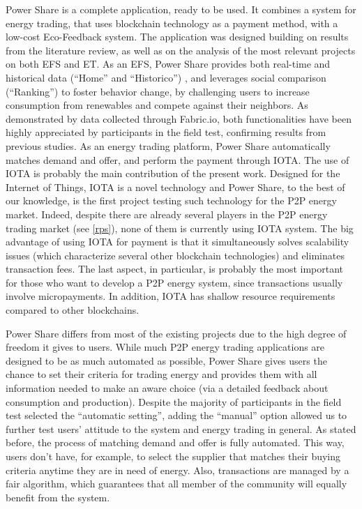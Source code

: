 \cleardoublepage
\label{chap:conclusions}

	
Power Share is a complete application, ready to be used. It combines a system for energy trading, that uses blockchain technology as a payment method, with a low-cost Eco-Feedback system. The application was designed building on results from the literature review, as well as on the analysis of the most relevant projects on both \ac{EFS} and \ac{ET}.
As an \ac{EFS}, Power Share provides both real-time and historical data (“Home” and “Historico”) \cite{Giulio2009}, and leverages social comparison (“Ranking”) \cite{Froehlich2010} to foster behavior change, by challenging users to increase consumption from renewables and compete against their neighbors. As demonstrated by data collected through Fabric.io, both functionalities have been highly appreciated by participants in the field test, confirming results from previous studies.
As an energy trading platform, Power Share automatically matches demand and offer, and perform the payment through IOTA. The use of IOTA is probably the main contribution of the present work. Designed for the Internet of Things, IOTA is a novel technology and Power Share, to the best of our knowledge, is the first project testing such technology for the \ac{P2P} energy market. Indeed, despite there are already several players in the \ac{P2P} energy trading market (see \cref{rps}), none of them is currently using IOTA system. The big advantage of using IOTA for payment is that it simultaneously solves scalability issues (which characterize several other blockchain technologies) and eliminates transaction fees. The last aspect, in particular, is probably the most important for those who want to develop a \ac{P2P} energy system, since transactions usually involve micropayments. In addition, IOTA has shallow resource requirements compared to other blockchains. 



Power Share differs from most of the existing projects due to the high degree of freedom it gives to users. While much \ac{P2P} energy trading applications are designed to be as much automated as possible, Power Share gives users the chance to set their criteria for trading energy and provides them with all information needed to make an aware choice (via a detailed feedback about consumption and production). Despite the majority of participants in the field test selected the “automatic setting”, adding the “manual” option allowed us to further test users’ attitude to the system and energy trading in general.
As stated before, the process of matching demand and offer is fully automated. This way, users don’t have, for example, to select the supplier that matches their buying criteria anytime they are in need of energy. Also, transactions are managed by a fair algorithm, which guarantees that all member of the community will equally benefit from the system. 



